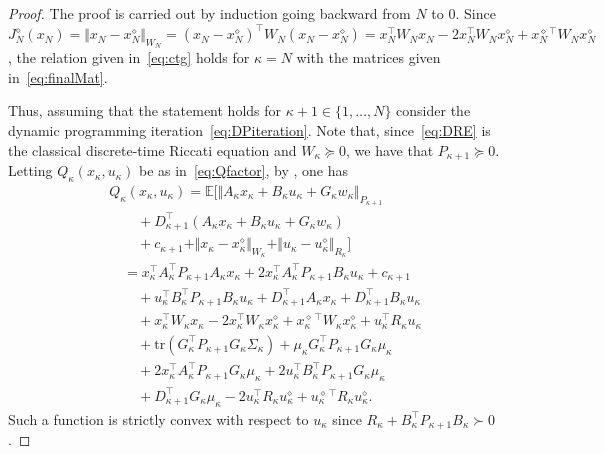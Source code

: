 \documentclass[10pt]{IEEEtran}      %
\newcommand{\bE}{\mathbb{E}}
\newcommand{\tr}{\mathrm{tr}}
\theoremstyle{theorem}
\theoremstyle{remark}
\begin{document}
\begin{proof}
The proof is carried out by induction going backward from $N$ to $0$.
 Since $J_N^\diamond(x_N)=\Vert x_N-x_N^\diamond\Vert_{W_N}
=(x_N-x_N^\diamond)^\top W_N (x_N-x_N^\diamond)= x_N^\top W_N x_N-2x_N^\top W_N x_N^\diamond+x_N^{\diamond\,\top}W_Nx_N^\diamond$,
the relation given in~\eqref{eq:ctg} holds for $\kappa=N$ with the matrices given in~\eqref{eq:finalMat}.

Thus, assuming that the statement holds for $\kappa+1\in\{1,\dots,N\}$ consider the dynamic programming 
iteration~\eqref{eq:DPiteration}. 
Note that, since~\eqref{eq:DRE} is the classical discrete-time Riccati equation and $W_\kappa\succeq 0$, 
we have that $P_{\kappa+1}\succeq 0$.
Letting $Q_\kappa(x_\kappa,u_\kappa)$ be as in~\eqref{eq:Qfactor}, by 
\cite[Thm.~1.5]{seber2012linear}, one has
\begin{align}
\nonumber &Q_\kappa(x_\kappa,u_\kappa) = \bE\big[\Vert A_\kappa x_\kappa +B_\kappa u_\kappa+G_\kappa w_\kappa \Vert_{P_{\kappa+1}}\\ \nonumber&\qquad+D_{\kappa+1}^\top (A_\kappa x_\kappa +B_\kappa u_\kappa+G_\kappa w_\kappa) \\
\nonumber & \qquad +c_{\kappa+1}+\Vert x_\kappa-x_\kappa^\diamond\Vert_{W_\kappa} +\Vert u_\kappa-u_\kappa^\diamond\Vert_{R_\kappa}\big]\\
\nonumber & \quad=  x_\kappa^\top A_\kappa^\top P_{\kappa+1}  A_\kappa x_\kappa + 2  x_\kappa^\top A_\kappa^\top P_{\kappa+1}B_\kappa u_\kappa+ c_{\kappa+1}\\
\nonumber &\qquad+ u_\kappa^\top B_\kappa^\top P_{\kappa+1}B_\kappa u_\kappa+D_{\kappa+1}^\top A_\kappa x_\kappa+D_{\kappa+1}^\top B_\kappa u_\kappa\\
\nonumber&\qquad +x_\kappa^\top W_{\kappa} x_\kappa - 2  x_\kappa^\top W_\kappa x_\kappa^\diamond + x_\kappa^{\diamond\,\top} W_\kappa x_\kappa^{\diamond}
+u_\kappa^\top R_\kappa u_\kappa\\
\nonumber&\qquad +\tr(G_\kappa^\top P_{\kappa+1}G_\kappa \Sigma_\kappa)+\mu_\kappa G_\kappa^\top P_{\kappa+1}G_\kappa\mu_\kappa\\
\nonumber&\qquad + 2  x_\kappa^\top A_\kappa^\top P_{\kappa+1}G_\kappa \mu_\kappa + 2 u_\kappa^\top B_\kappa^\top P_{\kappa+1} G_\kappa\mu_\kappa\\
&\qquad +D_{\kappa+1}^\top G_\kappa \mu_\kappa-2u_\kappa^\top R_\kappa u_\kappa^\diamond 
+u_\kappa^{\diamond\,\top} R_\kappa u_\kappa^\diamond .\label{eq:QQ}
\end{align}
Such a function is strictly convex with respect to $u_\kappa$ since $R_\kappa+B_\kappa^\top P_{\kappa+1}B_\kappa \succ 0$.

\end{proof}
\end{document}
